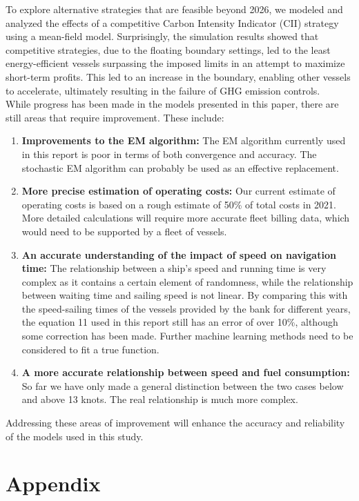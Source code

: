 \documentclass[a4paper,12pt]{article}
\begin{document}
To explore alternative strategies that are feasible beyond 2026, we modeled and analyzed the effects of a competitive Carbon Intensity Indicator (CII) strategy using a mean-field model.
Surprisingly, the simulation results showed that competitive strategies, due to the floating boundary settings, led to the least energy-efficient vessels surpassing the imposed limits in an attempt to maximize short-term profits.
This led to an increase in the boundary, enabling other vessels to accelerate, ultimately resulting in the failure of GHG emission controls.\\

While progress has been made in the models presented in this paper, there are still areas that require improvement. These include:
\begin{enumerate}
	\item \textbf{Improvements to the EM algorithm:} The EM algorithm currently used in this report is poor in terms of both convergence and accuracy. The stochastic EM algorithm can probably be used as an effective replacement.
	\item \textbf{More precise estimation of operating costs:} Our current estimate of operating costs is based on a rough estimate of 50\% of total costs in 2021. More detailed calculations will require more accurate fleet billing data, which would need to be supported by a fleet of vessels.
	\item  \textbf{An accurate understanding of the impact of speed on navigation time:} The relationship between a ship's speed and running time is very complex as it contains a certain element of randomness, while the relationship between waiting time and sailing speed is not linear. By comparing this with the speed-sailing times of the vessels provided by the bank for different years, the equation 11 used in this report still has an error of over 10\%, although some correction has been made. Further machine learning methods need to be considered to fit a true function.
	\item \textbf{A more accurate relationship between speed and fuel consumption:} So far we have only made a general distinction between the two cases below and above 13 knots. The real relationship is much more complex.
\end{enumerate}

Addressing these areas of improvement will enhance the accuracy and reliability of the models used in this study.


\newpage
\section{Appendix}
\end{document}
